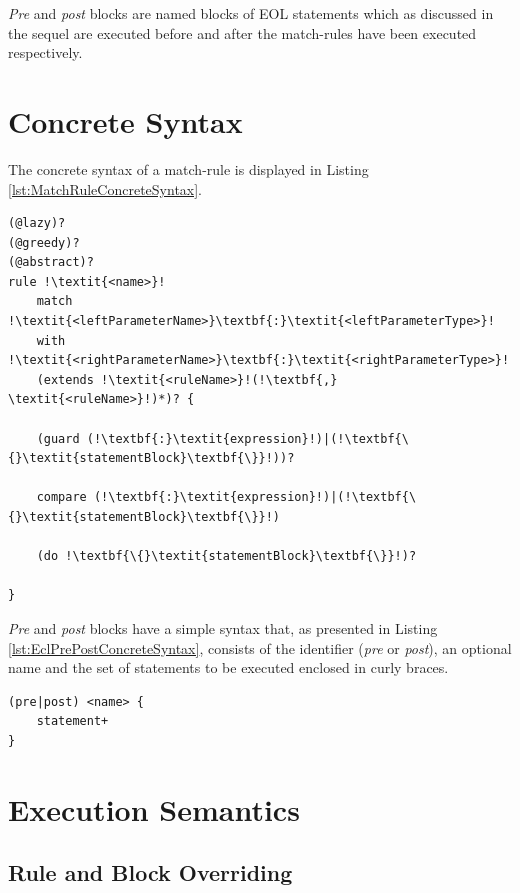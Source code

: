 \emph{Pre} and \emph{post} blocks are named blocks of EOL statements which as discussed in the sequel are executed before and after the match-rules have been executed respectively.

\section{Concrete Syntax}

The concrete syntax of a match-rule is displayed in Listing \ref{lst:MatchRuleConcreteSyntax}.

\begin{lstlisting}[caption=Concrete Syntax of a MatchRule, label=lst:MatchRuleConcreteSyntax, language=ECL, escapechar=!]
(@lazy)?
(@greedy)?
(@abstract)? 
rule !\textit{<name>}!
	match !\textit{<leftParameterName>}\textbf{:}\textit{<leftParameterType>}!
	with !\textit{<rightParameterName>}\textbf{:}\textit{<rightParameterType>}!
	(extends !\textit{<ruleName>}!(!\textbf{,} \textit{<ruleName>}!)*)? {
	
	(guard (!\textbf{:}\textit{expression}!)|(!\textbf{\{}\textit{statementBlock}\textbf{\}}!))?
	
	compare (!\textbf{:}\textit{expression}!)|(!\textbf{\{}\textit{statementBlock}\textbf{\}}!)
	
	(do !\textbf{\{}\textit{statementBlock}\textbf{\}}!)?
	
}
\end{lstlisting}

\emph{Pre} and \emph{post} blocks have a simple syntax that, as presented in Listing \ref{lst:EclPrePostConcreteSyntax}, consists of the identifier (\emph{pre} or \emph{post}), an optional name and the set of statements to be executed enclosed in curly braces.

\begin{lstlisting}[caption=Concrete Syntax of Pre and Post blocks, label=lst:EclPrePostConcreteSyntax, language=ECL]
(pre|post) <name> {
	statement+
}
\end{lstlisting}

\section{Execution Semantics}

\subsection{Rule and Block Overriding}

